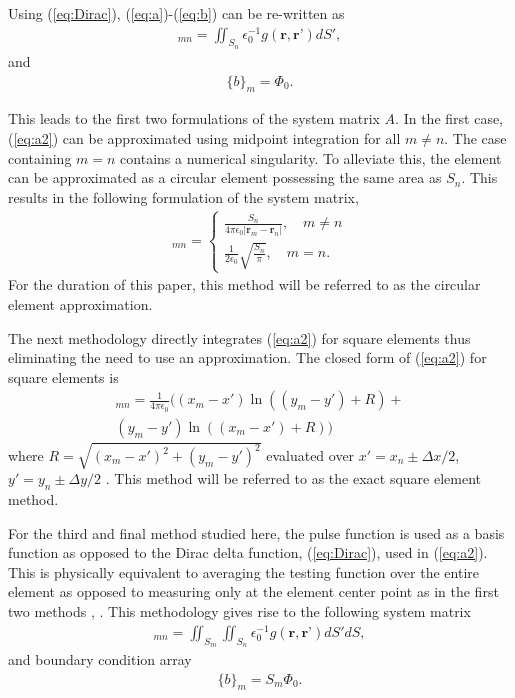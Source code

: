 Using (\ref{eq:Dirac}), (\ref{eq:a})-(\ref{eq:b}) can be re-written as
\begin{align}
    [A]_{mn}=\iint_{S_{n}} \epsilon_0^{-1}g(\textbf{r},\textbf{r'})dS',
    \label{eq:a2}
\end{align}
and 
\begin{align}
    \{b\}_m=\Phi_0.
    \label{eq:b2}
\end{align}

This leads to the first two formulations of the system matrix $A$. In the first case, (\ref{eq:a2}) can be approximated using midpoint integration for all $m \neq n$. The case containing $m=n$ contains a numerical singularity. To alleviate this, the element can be approximated as a circular element possessing the same area as $S_n$. This results in the following formulation of the system matrix,
\begin{align}
    [A]_{mn}=\begin{cases}
        \frac{S_n}{4\pi\epsilon_0|\textbf{r}_m-\textbf{r}_n|}, \quad m\neq n \\
        \frac{1}{2\epsilon_0}\sqrt{\frac{S_n}{\pi}}, \quad m=n.
    \end{cases}
    \label{eq:aaprox}
\end{align}
For the duration of this paper, this method will be referred to as the circular element approximation.

The next methodology directly integrates (\ref{eq:a2}) for square elements thus eliminating the need to use an approximation. The closed form of (\ref{eq:a2}) for square elements is
\begin{multline}
    [A]_{mn}=\frac{1}{4\pi\epsilon_0}\big((x_m-x')\ln((y_m-y')+R)+\\
    (y_m-y')\ln((x_m-x')+R)\big)
    \label{eq:aexact}
\end{multline}
where $R=\sqrt{(x_m-x')^2+(y_m-y')^2}$ evaluated over $x'=x_n\pm\Delta x / 2$, $y'=y_n\pm\Delta y / 2$ \cite{jin2011theory}. This method will be referred to as the exact square element method.

For the third and final method studied here, the pulse function is used as a basis function as opposed to the Dirac delta function, (\ref{eq:Dirac}), used in (\ref{eq:a2}). This is physically equivalent to averaging the testing function over the entire element as opposed to measuring only at the element center point as in the first two methods \cite{rothlecnotes}, \cite{jin2011theory}. This methodology gives rise to the following system matrix
\begin{align}
    [A]_{mn}=\iint_{S_m}\iint_{S_n} \epsilon_0^{-1}g(\textbf{r},\textbf{r'})dS'dS,
    \label{eq:a3}
\end{align}
and boundary condition array
\begin{align}
    \{b\}_m=S_m\Phi_0.
    \label{eq:b3}
\end{align}

